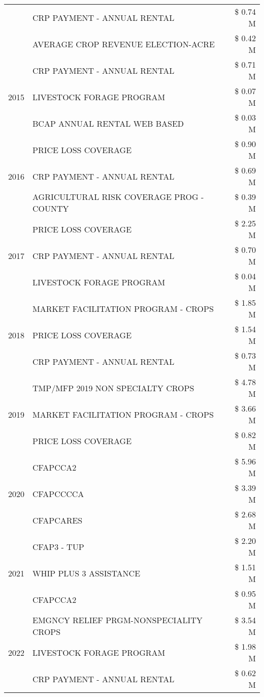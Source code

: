 \begin{tabular}{llr}
 & CRP PAYMENT - ANNUAL RENTAL & \$ 0.74 M \\
 & AVERAGE CROP REVENUE ELECTION-ACRE & \$ 0.42 M \\
\cline{1-3}
\multirow[t]{3}{*}{2015} & CRP PAYMENT - ANNUAL RENTAL & \$ 0.71 M \\
 & LIVESTOCK FORAGE PROGRAM & \$ 0.07 M \\
 & BCAP ANNUAL RENTAL WEB BASED & \$ 0.03 M \\
\cline{1-3}
\multirow[t]{3}{*}{2016} & PRICE LOSS COVERAGE & \$ 0.90 M \\
 & CRP PAYMENT - ANNUAL RENTAL & \$ 0.69 M \\
 & AGRICULTURAL RISK COVERAGE PROG - COUNTY & \$ 0.39 M \\
\cline{1-3}
\multirow[t]{3}{*}{2017} & PRICE LOSS COVERAGE & \$ 2.25 M \\
 & CRP PAYMENT - ANNUAL RENTAL & \$ 0.70 M \\
 & LIVESTOCK FORAGE PROGRAM & \$ 0.04 M \\
\cline{1-3}
\multirow[t]{3}{*}{2018} & MARKET FACILITATION PROGRAM - CROPS & \$ 1.85 M \\
 & PRICE LOSS COVERAGE & \$ 1.54 M \\
 & CRP PAYMENT - ANNUAL RENTAL & \$ 0.73 M \\
\cline{1-3}
\multirow[t]{3}{*}{2019} & TMP/MFP 2019 NON SPECIALTY CROPS & \$ 4.78 M \\
 & MARKET FACILITATION PROGRAM - CROPS & \$ 3.66 M \\
 & PRICE LOSS COVERAGE & \$ 0.82 M \\
\cline{1-3}
\multirow[t]{3}{*}{2020} & CFAPCCA2 & \$ 5.96 M \\
 & CFAPCCCCA & \$ 3.39 M \\
 & CFAPCARES & \$ 2.68 M \\
\cline{1-3}
\multirow[t]{3}{*}{2021} & CFAP3 - TUP & \$ 2.20 M \\
 & WHIP PLUS 3 ASSISTANCE & \$ 1.51 M \\
 & CFAPCCA2 & \$ 0.95 M \\
\cline{1-3}
\multirow[t]{3}{*}{2022} & EMGNCY RELIEF PRGM-NONSPECIALITY CROPS & \$ 3.54 M \\
 & LIVESTOCK FORAGE PROGRAM & \$ 1.98 M \\
 & CRP PAYMENT - ANNUAL RENTAL & \$ 0.62 M \\
\cline{1-3}
\bottomrule
\end{tabular}
